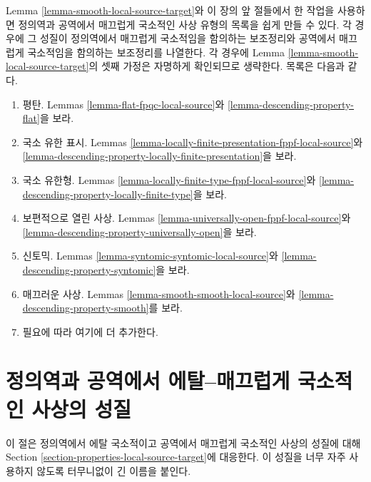 \begin{remark}
\label{remark-list-local-source-target}
Lemma \ref{lemma-smooth-local-source-target}와 이 장의 앞 절들에서 한 작업을
사용하면 정의역과 공역에서 매끄럽게 국소적인 사상 유형의 목록을 쉽게
만들 수 있다. 각 경우에 그 성질이 정의역에서 매끄럽게 국소적임을
함의하는 보조정리와 공역에서 매끄럽게 국소적임을 함의하는 보조정리를
나열한다. 각 경우에 Lemma \ref{lemma-smooth-local-source-target}의 셋째
가정은 자명하게 확인되므로 생략한다. 목록은 다음과 같다.
\begin{enumerate}
\item 평탄. Lemmas \ref{lemma-flat-fpqc-local-source}와
\ref{lemma-descending-property-flat}을 보라.
\item 국소 유한 표시. Lemmas
\ref{lemma-locally-finite-presentation-fppf-local-source}와
\ref{lemma-descending-property-locally-finite-presentation}을 보라.
\item 국소 유한형.
Lemmas \ref{lemma-locally-finite-type-fppf-local-source}와
\ref{lemma-descending-property-locally-finite-type}을 보라.
\item 보편적으로 열린 사상. Lemmas
\ref{lemma-universally-open-fppf-local-source}와
\ref{lemma-descending-property-universally-open}을 보라.
\item 신토믹. Lemmas \ref{lemma-syntomic-syntomic-local-source}와
\ref{lemma-descending-property-syntomic}을 보라.
\item 매끄러운 사상. Lemmas \ref{lemma-smooth-smooth-local-source}와
\ref{lemma-descending-property-smooth}를 보라.
\item 필요에 따라 여기에 더 추가한다.
\end{enumerate}
\end{remark}

\section{정의역과 공역에서 에탈--매끄럽게 국소적인 사상의 성질}
\label{section-properties-etale-smooth-local-source-target}

\noindent
이 절은 정의역에서 에탈 국소적이고 공역에서 매끄럽게 국소적인 사상의
성질에 대해 Section \ref{section-properties-local-source-target}에 대응한다.
이 성질을 너무 자주 사용하지 않도록 터무니없이 긴 이름을 붙인다.

